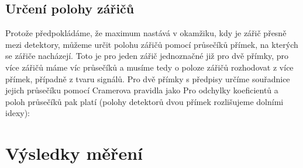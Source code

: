 \documentclass[10pt,a4paper]{article}
\begin{document}
\subsection*{Určení polohy zářičů}
Protože předpokládáme, že maximum nastává v okamžiku, kdy je zářič přesně mezi detektory, můžeme určit polohu zářičů pomocí průsečíků přímek, na kterých se zářiče nacházejí. Toto je pro jeden zářič jednoznačné již pro dvě přímky, pro více zářičů máme víc průsečíků a musíme tedy o poloze zářičů rozhodovat z více přímek, případně z tvaru signálů. Pro dvě přímky s předpisy
určíme souřadnice jejich průsečíku pomocí Cramerova pravidla jako \cite{studijnitext}
Pro odchylky koeficientů a poloh průsečíků pak platí (polohy detektorů dvou přímek rozlišujeme dolními idexy):
\section*{Výsledky měření}
\end{document}
